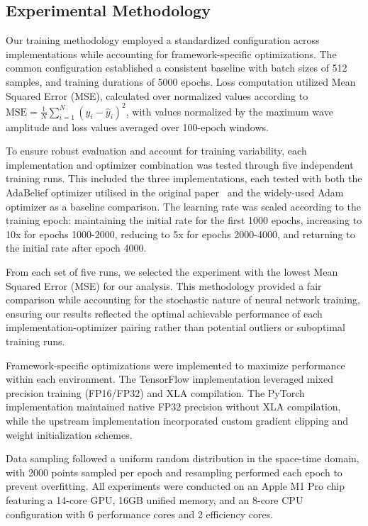 \documentclass[10pt,journal,compsoc,onecolumn]{IEEEtran}
\begin{document}
\subsection{Experimental Methodology}
Our training methodology employed a standardized configuration across implementations while accounting for framework-specific optimizations. The common configuration established a consistent baseline with batch sizes of 512 samples, and training durations of 5000 epochs. Loss computation utilized Mean Squared Error (MSE), calculated over normalized values according to $\text{MSE} = \frac{1}{N}\sum_{i=1}^N (y_i - \hat{y}_i)^2$, with values normalized by the maximum wave amplitude and loss values averaged over 100-epoch windows.

To ensure robust evaluation and account for training variability, each implementation and optimizer combination was tested through five independent training runs. This included the three implementations, each tested with both the AdaBelief optimizer utilised in the original paper~\cite{nif2023} and the widely-used Adam optimizer as a baseline comparison. The learning rate was scaled according to the training epoch: maintaining the initial rate for the first 1000 epochs, increasing to 10x for epochs 1000-2000, reducing to 5x for epochs 2000-4000, and returning to the initial rate after epoch 4000.

From each set of five runs, we selected the experiment with the lowest Mean Squared Error (MSE) for our analysis. This methodology provided a fair comparison while accounting for the stochastic nature of neural network training, ensuring our results reflected the optimal achievable performance of each implementation-optimizer pairing rather than potential outliers or suboptimal training runs.

Framework-specific optimizations were implemented to maximize performance within each environment. The TensorFlow implementation leveraged mixed precision training (FP16/FP32) and XLA compilation. The PyTorch implementation maintained native FP32 precision without XLA compilation, while the upstream implementation incorporated custom gradient clipping and weight initialization schemes.

Data sampling followed a uniform random distribution in the space-time domain, with 2000 points sampled per epoch and resampling performed each epoch to prevent overfitting. All experiments were conducted on an Apple M1 Pro chip featuring a 14-core GPU, 16GB unified memory, and an 8-core CPU configuration with 6 performance cores and 2 efficiency cores.
\end{document}
